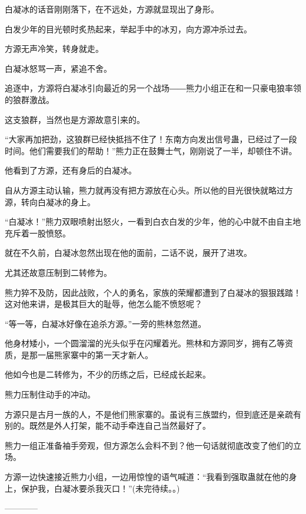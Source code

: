 \begin{this_body}
白凝冰的话音刚刚落下，在不远处，方源就显现出了身形。

白发少年的目光顿时炙热起来，举起手中的冰刃，向方源冲杀过去。

方源无声冷笑，转身就走。

白凝冰怒骂一声，紧追不舍。

追逐中，方源将白凝冰引向最近的另一个战场――熊力小组正在和一只豪电狼率领的狼群激战。

这支狼群，当然也是方源故意引来的。

“大家再加把劲，这狼群已经快抵挡不住了！东南方向发出信号蛊，已经过了一段时间。他们需要我们的帮助！”熊力正在鼓舞士气，刚刚说了一半，却顿住不讲。

他看到了方源，还有身后的白凝冰。

自从方源主动认输，熊力就再没有把方源放在心头。所以他的目光很快就略过方源，转向白凝冰的身上。

“白凝冰！”熊力双眼喷射出怒火，一看到白衣白发的少年，他的心中就不由自主地充斥着一股愤怒。

就在不久前，白凝冰忽然出现在他的面前，二话不说，展开了进攻。

尤其还故意压制到二转修为。

熊力猝不及防，因此战败，个人的勇名，家族的荣耀都遭到了白凝冰的狠狠践踏！这对他来讲，是极其巨大的耻辱，他怎么能不愤怒呢？

“等一等，白凝冰好像在追杀方源。”一旁的熊林忽然道。

他身材矮小，一个圆溜溜的光头似乎在闪耀着光。熊林和方源同岁，拥有乙等资质，是那一届熊家寨中的第一天才新人。

他如今也是二转修为，不少的历练之后，已经成长起来。

熊力压制住动手的冲动。

方源只是古月一族的人，不是他们熊家寨的。虽说有三族盟约，但到底还是亲疏有别的。既然是外人打架，能不动手牵连自己当然最好了。

熊力一组正准备袖手旁观，但方源怎么会料不到？他一句话就彻底改变了他们的立场。

方源一边快速接近熊力小组，一边用惊惶的语气喊道：“我看到强取蛊就在他的身上，保护我，白凝冰要杀我灭口！”(未完待续。。)

------------

\end{this_body}

